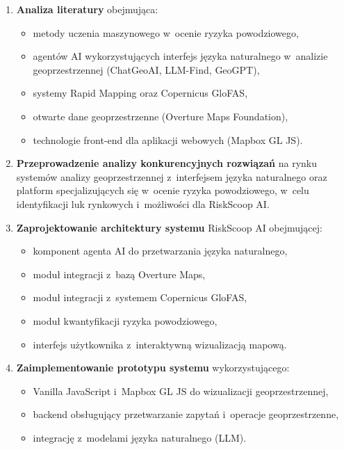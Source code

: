 \begin{enumerate}
    \item \textbf{Analiza literatury} obejmująca:
    \begin{itemize}
        \item metody uczenia maszynowego w~ocenie ryzyka powodziowego,
        \item agentów AI wykorzystujących interfejs języka naturalnego w~analizie geoprzestrzennej (ChatGeoAI, LLM-Find, GeoGPT),
        \item systemy Rapid Mapping oraz Copernicus GloFAS,
        \item otwarte dane geoprzestrzenne (Overture Maps Foundation),
        \item technologie front-end dla aplikacji webowych (Mapbox GL JS).
    \end{itemize}

    \item \textbf{Przeprowadzenie analizy konkurencyjnych rozwiązań} na rynku systemów analizy geoprzestrzennej z~interfejsem języka naturalnego oraz platform specjalizujących się w~ocenie ryzyka powodziowego, w~celu identyfikacji luk rynkowych i~możliwości dla RiskScoop AI.

    \item \textbf{Zaprojektowanie architektury systemu} RiskScoop AI obejmującej:
    \begin{itemize}
        \item komponent agenta AI do przetwarzania języka naturalnego,
        \item moduł integracji z~bazą Overture Maps,
        \item moduł integracji z~systemem Copernicus GloFAS,
        \item moduł kwantyfikacji ryzyka powodziowego,
        \item interfejs użytkownika z~interaktywną wizualizacją mapową.
    \end{itemize}

    \item \textbf{Zaimplementowanie prototypu systemu} wykorzystującego:
    \begin{itemize}
        \item Vanilla JavaScript i~Mapbox GL JS do wizualizacji geoprzestrzennej,
        \item backend obsługujący przetwarzanie zapytań i~operacje geoprzestrzenne,
        \item integrację z~modelami języka naturalnego (LLM).
    \end{itemize}


\end{enumerate}
